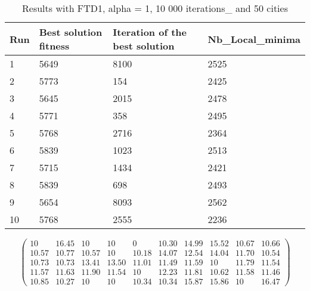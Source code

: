 \documentclass[12pt,oneside,a4paper]{article}
\begin{document}
\begin{table}[h]
  \centering
  \small
  \begin{tabular}{llll}
    \hline
    \multicolumn{1}{|l|}{\textbf{Run}}& \multicolumn{1}{l|}{\textbf{Best solution fitness}}& \multicolumn{1}{l|}{\textbf{Iteration of the best solution}}& \multicolumn{1}{l|}{\textbf{Nb\_Local\_minima}}\\ \hline
    \multicolumn{1}{|l|}{1} & \multicolumn{1}{l|}{5649}  & \multicolumn{1}{l|}{8100} & \multicolumn{1}{l|}{2525}  \\ \hline
    \multicolumn{1}{|l|}{2} & \multicolumn{1}{l|}{5773}  & \multicolumn{1}{l|}{154} & \multicolumn{1}{l|}{2425}  \\ \hline
    \multicolumn{1}{|l|}{3} & \multicolumn{1}{l|}{5645}  & \multicolumn{1}{l|}{2015}  & \multicolumn{1}{l|}{2478}  \\ \hline
    \multicolumn{1}{|l|}{4} & \multicolumn{1}{l|}{5771}  & \multicolumn{1}{l|}{358}  & \multicolumn{1}{l|}{2495}  \\ \hline
    \multicolumn{1}{|l|}{5} & \multicolumn{1}{l|}{5768}  & \multicolumn{1}{l|}{2716}  & \multicolumn{1}{l|}{2364}  \\ \hline
    \multicolumn{1}{|l|}{6} & \multicolumn{1}{l|}{5839}  & \multicolumn{1}{l|}{1023}  & \multicolumn{1}{l|}{2513}  \\ \hline
    \multicolumn{1}{|l|}{7} & \multicolumn{1}{l|}{5715}  & \multicolumn{1}{l|}{1434}  & \multicolumn{1}{l|}{2421}  \\ \hline
    \multicolumn{1}{|l|}{8} & \multicolumn{1}{l|}{5839}  & \multicolumn{1}{l|}{698} & \multicolumn{1}{l|}{2493}  \\ \hline
    \multicolumn{1}{|l|}{9} & \multicolumn{1}{l|}{5654}  & \multicolumn{1}{l|}{8093} & \multicolumn{1}{l|}{2562}  \\ \hline
    \multicolumn{1}{|l|}{10} & \multicolumn{1}{l|}{5768}  & \multicolumn{1}{l|}{2555} & \multicolumn{1}{l|}{2236}  \\ \hline
  \end{tabular}
  \caption{Results with FTD1, alpha = 1, 10 000 iterations\_ and 50 cities}
\end{table}

\begin{equation}
  \tag{Mean Tabu Duration for each city (alpha = 1 and 50 cities)}
  \begin{pmatrix} 10 & 16.45 & 10 & 10 & 0 & 10.30 & 14.99 & 15.52 & 10.67 & 10.66 \\
                  10.57 & 10.77 & 10.57 & 10 & 10.18 & 14.07 & 12.54 & 14.04 & 11.70 & 10.54 \\
                  10.73 & 10.73 & 13.41 & 13.50 & 11.01 & 11.49 & 11.59 & 10 & 11.79 & 11.54 \\
                  11.57 & 11.63 & 11.90 & 11.54 & 10 & 12.23 & 11.81 & 10.62 & 11.58 & 11.46 \\
                  10.85 & 10.27 & 10 & 10 & 10.34 & 10.34 & 15.87 & 15.86 & 10 & 16.47
  \end{pmatrix}
\end{equation}
\end{document}
